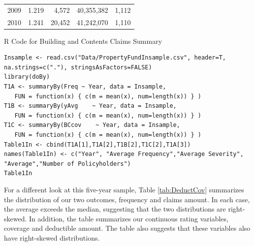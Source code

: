 \documentclass[]{book}
\begin{document}
\begin{longtable}[]{@{}lrrrr@{}}
\begin{minipage}[t]{0.25\columnwidth}
2009\strut
\end{minipage} & \begin{minipage}[t]{0.14\columnwidth}\raggedleft\strut
1.219\strut
\end{minipage} & \begin{minipage}[t]{0.13\columnwidth}\raggedleft\strut
4,572\strut
\end{minipage} & \begin{minipage}[t]{0.15\columnwidth}\raggedleft\strut
40,355,382\strut
\end{minipage} & \begin{minipage}[t]{0.17\columnwidth}\raggedleft\strut
1,112\strut
\end{minipage}\tabularnewline
\begin{minipage}[t]{0.25\columnwidth}\raggedright\strut
2010\strut
\end{minipage} & \begin{minipage}[t]{0.14\columnwidth}\raggedleft\strut
1.241\strut
\end{minipage} & \begin{minipage}[t]{0.13\columnwidth}\raggedleft\strut
20,452\strut
\end{minipage} & \begin{minipage}[t]{0.15\columnwidth}\raggedleft\strut
41,242,070\strut
\end{minipage} & \begin{minipage}[t]{0.17\columnwidth}\raggedleft\strut
1,110\strut
\end{minipage}\tabularnewline
\bottomrule
\end{longtable}

R Code for Building and Contents Claims Summary

\hypertarget{display.CoverageBC.2}{}
\begin{verbatim}
Insample <- read.csv("Data/PropertyFundInsample.csv", header=T, na.strings=c("."), stringsAsFactors=FALSE)
library(doBy)
T1A <- summaryBy(Freq ~ Year, data = Insample, 
   FUN = function(x) { c(m = mean(x), num=length(x)) } )
T1B <- summaryBy(yAvg    ~ Year, data = Insample,   
   FUN = function(x) { c(m = mean(x), num=length(x)) } )
T1C <- summaryBy(BCcov    ~ Year, data = Insample,   
   FUN = function(x) { c(m = mean(x), num=length(x)) } )
Table1In <- cbind(T1A[1],T1A[2],T1B[2],T1C[2],T1A[3])
names(Table1In) <- c("Year", "Average Frequency","Average Severity", "Average","Number of Policyholders")
Table1In
\end{verbatim}

For a different look at this five-year sample, Table \ref{tab:DeductCov}
summarizes the distribution of our two outcomes, frequency and claims
amount. In each case, the average exceeds the median, suggesting that
the two distributions are right-skewed. In addition, the table
summarizes our continuous rating variables, coverage and deductible
amount. The table also suggests that these variables also have
right-skewed distributions.
\end{document}
